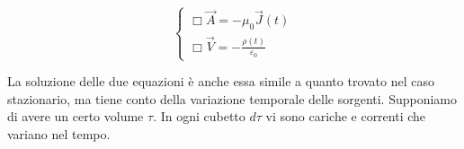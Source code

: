 \[
	\boxed{\left\{ \begin{array}{l}
		 	\Box \vec{A} = -\mu_0 \vec{J} (t) \\
		 	\Box \vec{V} = -\frac{\rho (t)}{\varepsilon_0}
		\end{array} \right.}
\]

La soluzione delle due equazioni è anche essa simile a quanto trovato nel caso stazionario, ma tiene conto della variazione temporale delle sorgenti.
Supponiamo di avere un certo volume $\tau$. In ogni cubetto $d\tau$ vi sono cariche e correnti che variano nel tempo.

\begin{figure}[htpb]
	\centering


	\begin{tikzpicture}[x=0.75pt,y=0.75pt,yscale=-1,xscale=1]


\end{tikzpicture}
\end{figure}
